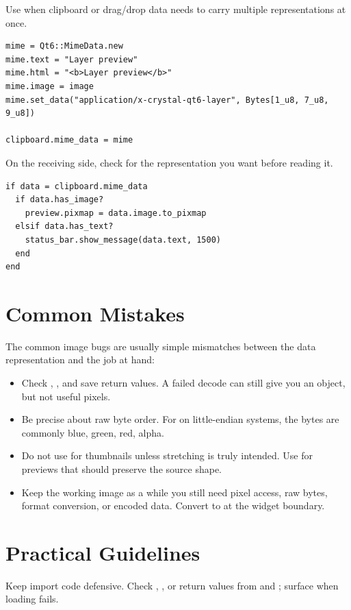 Use  when clipboard or drag/drop data needs to carry multiple representations at once.

\begin{lstlisting}[style=crystal]
mime = Qt6::MimeData.new
mime.text = "Layer preview"
mime.html = "<b>Layer preview</b>"
mime.image = image
mime.set_data("application/x-crystal-qt6-layer", Bytes[1_u8, 7_u8, 9_u8])

clipboard.mime_data = mime
\end{lstlisting}

On the receiving side, check for the representation you want before reading it.

\begin{lstlisting}[style=crystal]
if data = clipboard.mime_data
  if data.has_image?
    preview.pixmap = data.image.to_pixmap
  elsif data.has_text?
    status_bar.show_message(data.text, 1500)
  end
end
\end{lstlisting}

\section{Common Mistakes}

The common image bugs are usually simple mismatches between the data representation and the job at hand:

\begin{itemize}
\item Check , , and save return values. A failed decode can still give you an object, but not useful pixels.
\item Be precise about raw byte order. For  on little-endian systems, the bytes are commonly blue, green, red, alpha.
\item Do not use  for thumbnails unless stretching is truly intended. Use  for previews that should preserve the source shape.
\item Keep the working image as a  while you still need pixel access, raw bytes, format conversion, or encoded data. Convert to  at the widget boundary.
\end{itemize}

\section{Practical Guidelines}

Keep import code defensive. Check , , or return values from  and ; surface  when loading fails.

